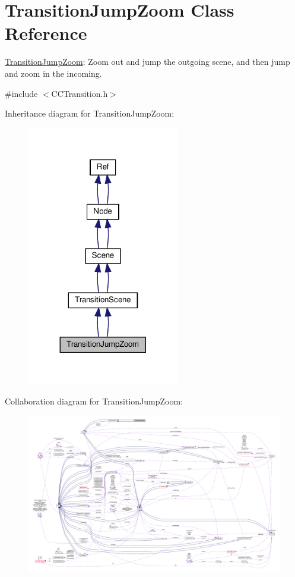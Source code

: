 \hypertarget{classTransitionJumpZoom}{}\section{Transition\+Jump\+Zoom Class Reference}
\label{classTransitionJumpZoom}


\hyperlink{classTransitionJumpZoom}{Transition\+Jump\+Zoom}\+: Zoom out and jump the outgoing scene, and then jump and zoom in the incoming.  




{\ttfamily \#include $<$C\+C\+Transition.\+h$>$}



Inheritance diagram for Transition\+Jump\+Zoom\+:
\nopagebreak
\begin{figure}[H]
\begin{center}
\leavevmode
\includegraphics[width=188pt]{classTransitionJumpZoom__inherit__graph}
\end{center}
\end{figure}


Collaboration diagram for Transition\+Jump\+Zoom\+:
\nopagebreak
\begin{figure}[H]
\begin{center}
\leavevmode
\includegraphics[width=350pt]{classTransitionJumpZoom__coll__graph}
\end{center}
\end{figure}
